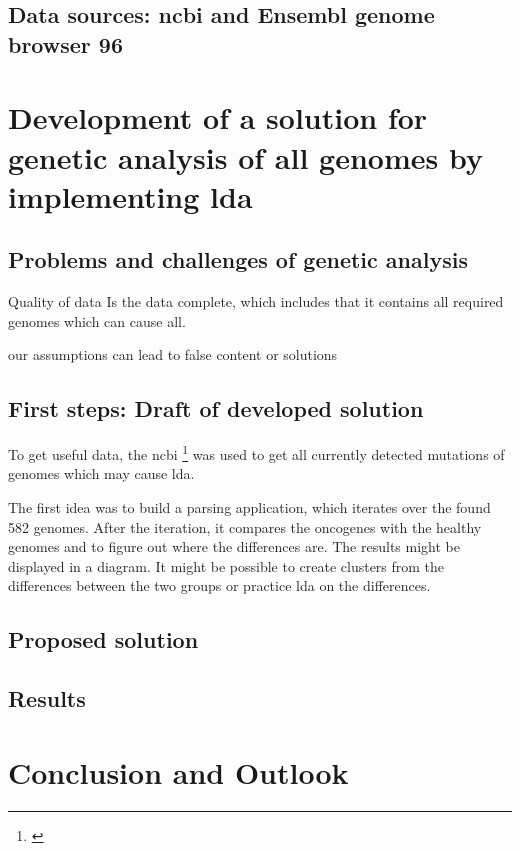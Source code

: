 \section{Data sources: \gls{ncbi} and Ensembl genome browser 96}\label{datasources}

\chapter{Development of a solution for genetic analysis of \gls{all} genomes by implementing \gls{lda}}\label{development}
\section{Problems and challenges of genetic analysis}\label{problems_challenges}
Quality of data 
Is the data complete, which includes that it contains all required genomes which can cause \gls{all}.

our assumptions can lead to false content or solutions 

\section{First steps: Draft of developed solution}\label{draft}

To get useful data, the \gls{ncbi} \footnote{\autocite{ncbi}} was used to get all currently detected mutations of genomes which may cause \gls{lda}.

The first idea was to build a parsing application, which iterates over the found 582 genomes. After the iteration, it compares the oncogenes with the healthy genomes and to figure out where the differences are. The results might be displayed in a diagram. It might be possible to create clusters from the differences between the two groups or practice \gls{lda} on the differences.

\section{Proposed solution}\label{proposed_solution}
\section{Results}\label{results}


\chapter{Conclusion and Outlook}\label{conclusion_outlook}
